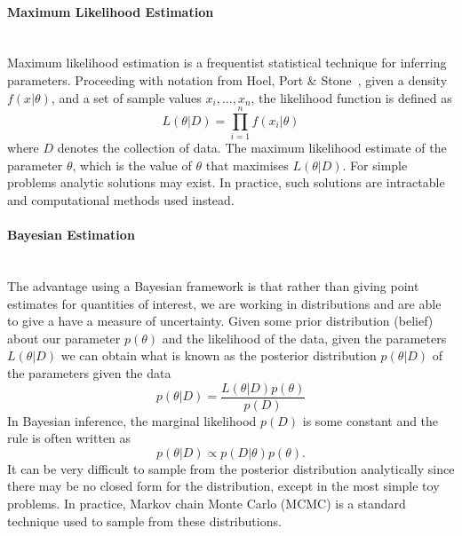 \paragraph{Maximum Likelihood Estimation} ~\\
\noindent Maximum likelihood estimation is a frequentist statistical technique for inferring parameters. Proceeding with notation from Hoel, Port \& Stone~\cite{hoel1971introduction}, given a density $f(x|\theta)$, and a set of sample values $x_i,\ldots,x_n$, the likelihood function is defined as  
	\begin{equation}
		L(\theta|D) = \prod_{i=1}^{n}f(x_i|\theta)
	\end{equation}
where $D$ denotes the collection of data. The maximum likelihood estimate of the parameter $\theta$, which is the value of $\theta$ that maximises $L(\theta|D)$. For simple problems analytic solutions may exist. In practice, such solutions are intractable and computational methods used instead.

\paragraph{Bayesian Estimation}~\\
\noindent The advantage using a Bayesian framework is that rather than giving point estimates for quantities of interest, we are working in distributions and are able to give a have a measure of uncertainty. Given some prior distribution (belief) about our parameter $p(\theta)$ and the likelihood of the data, given the parameters $L(\theta|D)$ we can obtain what is known as the posterior distribution $ p(\theta|D)$ of the parameters given the data 
    \begin{equation}
        p(\theta|D) = \frac{L(\theta|D)p(\theta)}{p(D)}
    \end{equation}
In Bayesian inference, the marginal likelihood $p(D)$ is some constant and the rule is often written as 
    \begin{equation}
        p(\theta|D) \propto p(D|\theta)p(\theta).
    \end{equation}
It can be very difficult to sample from the posterior distribution analytically since there may be no closed form for the distribution, except in the most simple toy problems. In practice, Markov chain Monte Carlo (MCMC) is a standard technique used to sample from these distributions. 


